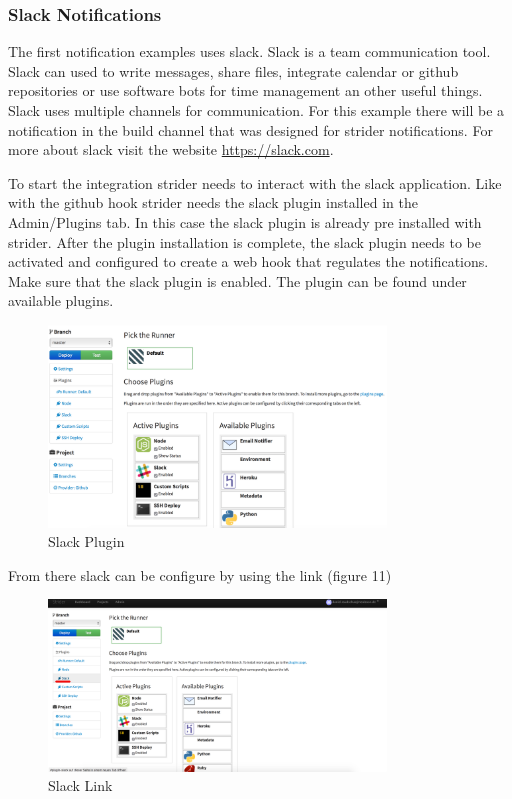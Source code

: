 \subsubsection{Slack Notifications}
The first notification examples uses slack. Slack is a team communication tool. Slack can used to write messages, share files, integrate calendar or
github repositories or use software bots for time management an other useful things. Slack uses multiple channels for communication. For this example there
will be a notification in the build channel that was designed for strider notifications. For more about slack visit the website \url{https://slack.com}.

To start the integration strider needs to interact with the slack application. Like with the github hook strider needs the slack
plugin installed in the Admin/Plugins tab. In this case the slack plugin is already pre installed with strider. After the plugin installation
is complete, the slack plugin needs to be activated and configured to create a web hook that regulates the notifications.
Make sure that the slack plugin is enabled. The plugin can be found under available plugins.

\begin{figure}[h!]
  \centering
  \includegraphics[width=0.8\textwidth]{images/slack.png}
  \caption{Slack Plugin}
\end{figure}

From there slack can be configure by using the link (figure 11)

\begin{figure}[h!]
  \centering
  \includegraphics[width=0.8\textwidth]{images/slack_link.png}
  \caption{Slack Link}
\end{figure}


